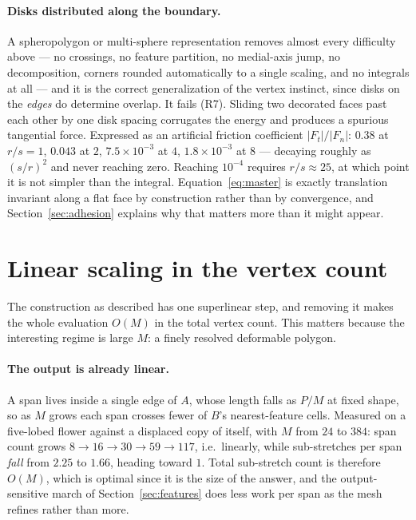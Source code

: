 \documentclass[11pt]{article}
\begin{document}
\paragraph{Disks distributed along the boundary.} A spheropolygon or multi-sphere representation removes almost every difficulty above --- no crossings, no feature partition, no medial-axis jump, no decomposition, corners rounded automatically to a single scaling, and no integrals at all --- and it is the correct generalization of the vertex instinct, since disks on the \emph{edges} do determine overlap. It fails (R7). Sliding two decorated faces past each other by one disk spacing corrugates the energy and produces a spurious tangential force. Expressed as an artificial friction coefficient $|F_t|/|F_n|$: $0.38$ at $r/s = 1$, $0.043$ at $2$, $7.5\times10^{-3}$ at $4$, $1.8\times10^{-3}$ at $8$ --- decaying roughly as $(s/r)^2$ and never reaching zero. Reaching $10^{-4}$ requires $r/s\approx25$, at which point it is not simpler than the integral. Equation~\eqref{eq:master} is exactly translation invariant along a flat face by construction rather than by convergence, and Section~\ref{sec:adhesion} explains why that matters more than it might appear.

\section{Linear scaling in the vertex count}
\label{sec:scaling}

The construction as described has one superlinear step, and removing it makes the whole evaluation $O(M)$ in the total vertex count. This matters because the interesting regime is large $M$: a finely resolved deformable polygon.

\paragraph{The output is already linear.} A span lives inside a single edge of $A$, whose length falls as $P/M$ at fixed shape, so as $M$ grows each span crosses fewer of $B$'s nearest-feature cells. Measured on a five-lobed flower against a displaced copy of itself, with $M$ from $24$ to $384$: span count grows $8\to16\to30\to59\to117$, i.e.\ linearly, while sub-stretches per span \emph{fall} from $2.25$ to $1.66$, heading toward $1$. Total sub-stretch count is therefore $O(M)$, which is optimal since it is the size of the answer, and the output-sensitive march of Section~\ref{sec:features} does less work per span as the mesh refines rather than more.
\end{document}
